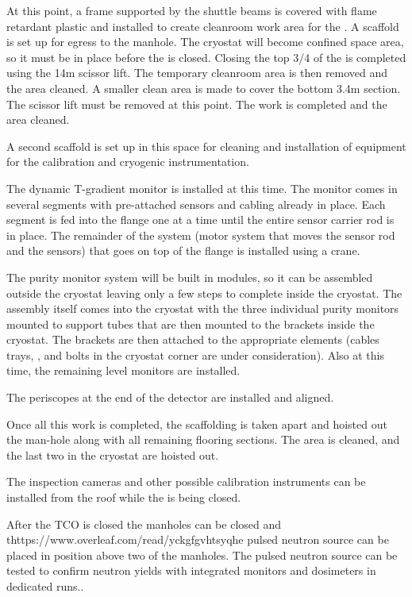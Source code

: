 At this point, a frame supported by the shuttle beams is covered with flame retardant plastic and installed to create cleanroom work area for the .  A scaffold is set up for egress to the manhole. The cryostat will become confined space area, so it must be in place before the  is closed.  Closing the top 3/4 of the  is completed using the 14m scissor lift. The temporary cleanroom area is then removed and the area cleaned. A smaller clean area is made to cover the bottom 3.4m  section.  The scissor lift must be removed at this point. The  work is completed and the area cleaned.

A second scaffold is set up in this space  for cleaning and installation of equipment for the calibration and cryogenic instrumentation.

The dynamic T-gradient monitor is installed at this time. 
The monitor comes in several segments with pre-attached sensors and cabling already in place. Each segment is fed into the flange one at a time until the entire sensor carrier rod is in place. The remainder of the system (motor system that moves the sensor rod and the sensors) that goes on top of the flange is installed using a crane. 

The purity monitor system will be built in modules, so it can be assembled outside the cryostat leaving only a few steps to complete inside the cryostat. 
The assembly itself comes into the cryostat with the three individual purity monitors mounted to support tubes that are then mounted to the brackets inside the cryostat. The brackets are then attached to the appropriate elements (cables trays, , and bolts in the cryostat corner are under consideration). Also at this time, the remaining level monitors are installed.

The periscopes at the end of the detector are installed and aligned. 

Once all this work is completed, the scaffolding is taken apart and hoisted out the man-hole along with all remaining flooring sections. The area is cleaned, and the last two  in the cryostat are hoisted out. 

The inspection cameras and other possible calibration instruments can be installed from the roof while the  is being closed.

After the TCO is closed the manholes can be closed and thttps://www.overleaf.com/read/yckgfgvhtsyqhe pulsed neutron source can be placed in position above two of the manholes. The pulsed neutron source can be tested to confirm neutron yields with integrated monitors and dosimeters in dedicated runs..

